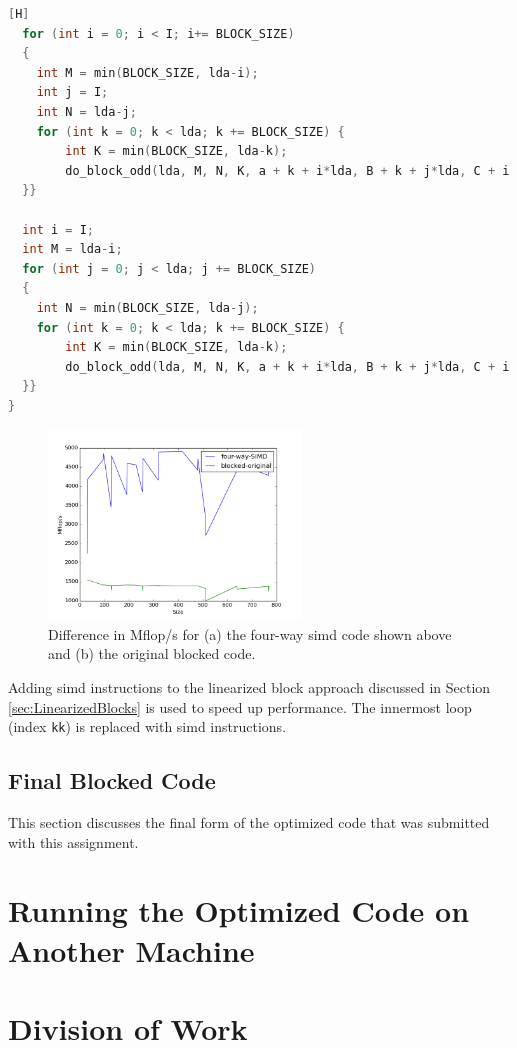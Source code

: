 \documentclass[10pt]{article}
\begin{document}
\begin{lstlisting}[language=C, basicstyle=\small][H]
  for (int i = 0; i < I; i+= BLOCK_SIZE)
  {
    int M = min(BLOCK_SIZE, lda-i);
    int j = I;
    int N = lda-j;
    for (int k = 0; k < lda; k += BLOCK_SIZE) {
        int K = min(BLOCK_SIZE, lda-k);
        do_block_odd(lda, M, N, K, a + k + i*lda, B + k + j*lda, C + i + j*lda);
  }}

  int i = I;
  int M = lda-i;
  for (int j = 0; j < lda; j += BLOCK_SIZE)
  {
    int N = min(BLOCK_SIZE, lda-j);
    for (int k = 0; k < lda; k += BLOCK_SIZE) {
        int K = min(BLOCK_SIZE, lda-k);
        do_block_odd(lda, M, N, K, a + k + i*lda, B + k + j*lda, C + i + j*lda);
  }}
}
\end{lstlisting}

\begin{figure}[H]
\centering
\includegraphics[width=0.6\textwidth]{figures/four-way-simd.png}
\caption{Difference in Mflop/s for (a) the four-way \gls{simd} code shown above and (b) the original blocked code.}
\label{fig:7}
\end{figure}

Adding \gls{simd} instructions to the linearized block approach discussed in Section \ref{sec:LinearizedBlocks} is used to speed up performance. The innermost loop (index {\tt kk}) is replaced with \gls{simd} instructions. 

\subsection{Final Blocked Code}

This section discusses the final form of the optimized code that was submitted with this assignment. 

\section{Running the Optimized Code on Another Machine}

\section{Division of Work}
\end{document}
